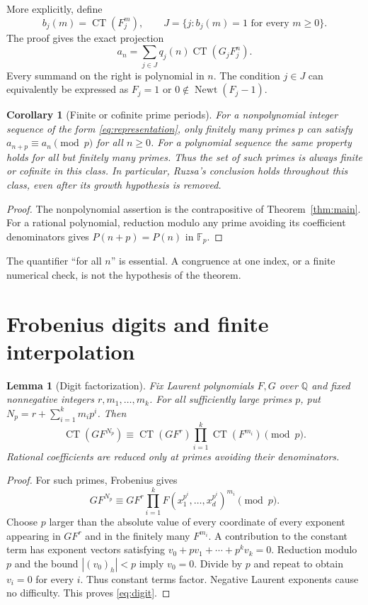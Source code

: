 \documentclass[11pt,a4paper]{article}
\newtheorem{lemma}[theorem]{Lemma}
\newtheorem{corollary}[theorem]{Corollary}
\theoremstyle{remark}\newtheorem{remark}[theorem]{Remark}
\newcommand{\Q}{\mathbb Q}\newcommand{\Z}{\mathbb Z}
\newcommand{\CT}{\operatorname{CT}}
\newcommand{\Newt}{\operatorname{Newt}}
\begin{document}
More explicitly, define
\[
 b_j(m)=\CT(F_j^m),\qquad
 J=\{j:b_j(m)=1\text{ for every }m\ge0\}.
\]
The proof gives the exact projection
\begin{equation}\label{eq:projection}
 a_n=\sum_{j\in J}q_j(n)\CT(G_jF_j^n).
\end{equation}
Every summand on the right is polynomial in $n$.
The condition $j\in J$ can equivalently be expressed as
$F_j=1$ or $0\notin\Newt(F_j-1)$.

\begin{corollary}[Finite or cofinite prime periods]\label{cor:finitelymany}
For a nonpolynomial integer sequence of the form
\eqref{eq:representation}, only finitely many primes $p$ can satisfy
$a_{n+p}\equiv a_n\pmod p$ for all $n\ge0$.
For a polynomial sequence the same property holds for all but finitely many
primes. Thus the set of such primes is always finite or cofinite in this class.
In particular, Ruzsa's conclusion holds throughout this class, even after
its growth hypothesis is removed.
\end{corollary}

\begin{proof}
The nonpolynomial assertion is the contrapositive of Theorem~\ref{thm:main}.
For a rational polynomial, reduction modulo any prime avoiding its
coefficient denominators gives $P(n+p)=P(n)$ in $\mathbb F_p$.
\end{proof}

The quantifier ``for all $n$'' is essential. A congruence at one index,
or a finite numerical check, is not the hypothesis of the theorem.

\section{Frobenius digits and finite interpolation}

\begin{lemma}[Digit factorization]\label{lem:digits}
Fix Laurent polynomials $F,G$ over $\Q$ and fixed nonnegative integers
$r,m_1,\ldots,m_k$. For all sufficiently large primes $p$, put
$N_p=r+\sum_{i=1}^k m_i p^i$. Then
\begin{equation}\label{eq:digit}
 \CT(GF^{N_p})\equiv
 \CT(GF^r)\prod_{i=1}^k\CT(F^{m_i})\pmod p.
\end{equation}
Rational coefficients are reduced only at primes avoiding their denominators.
\end{lemma}

\begin{proof}
For such primes, Frobenius gives
\[
 GF^{N_p}\equiv GF^r\prod_{i=1}^k F(x_1^{p^i},\ldots,x_d^{p^i})^{m_i}
 \pmod p.
\]
Choose $p$ larger than the absolute value of every coordinate of every
exponent appearing in $GF^r$ and in the finitely many $F^{m_i}$.
A contribution to the constant term has exponent vectors satisfying
$v_0+p v_1+\cdots+p^k v_k=0$.
Reduction modulo $p$ and the bound $|(v_0)_h|<p$ imply $v_0=0$.
Divide by $p$ and repeat to obtain $v_i=0$ for every $i$.
Thus constant terms factor. Negative Laurent exponents cause no difficulty.
This proves \eqref{eq:digit}.
\end{proof}
\end{document}
